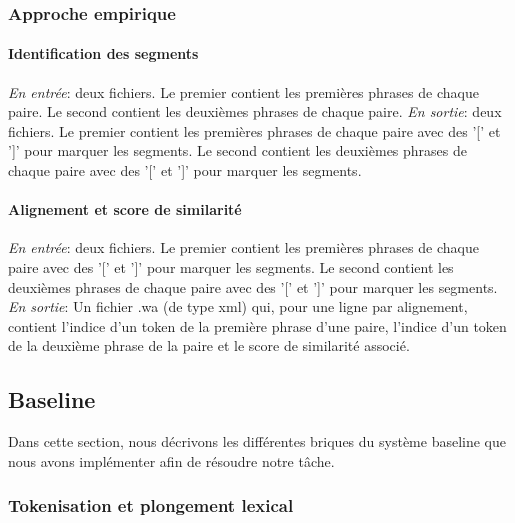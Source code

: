 \documentclass[a4paper, twoside, 11pt]{article}
\begin{document}
        \subsubsection{Approche empirique}

    \paragraph{Identification des segments}
    \hfill \break
    \textit{En entrée}: deux fichiers. Le premier contient les premières phrases de chaque paire. Le second contient les deuxièmes phrases de chaque paire. \hfill \break
    \textit{En sortie}: deux fichiers. Le premier contient les premières phrases de chaque paire avec des '[' et ']' pour marquer les segments. Le second contient les deuxièmes phrases de chaque paire avec des '[' et ']' pour marquer les segments.

 \paragraph{Alignement et score de similarité}
    \hfill \break
    \textit{En entrée}: deux fichiers. Le premier contient les premières phrases de chaque paire avec des '[' et ']' pour marquer les segments. Le second contient les deuxièmes phrases de chaque paire avec des '[' et ']' pour marquer les segments. \hfill \break
    \textit{En sortie}: Un fichier .wa (de type xml) qui, pour une ligne par alignement, contient l'indice d'un token de la première phrase d'une paire, l'indice d'un token de la deuxième phrase de la paire et le score de similarité associé.



    \subsection{Baseline}

    Dans cette section, nous décrivons les différentes briques du système baseline que nous avons implémenter afin de résoudre notre tâche.

    \subsubsection{Tokenisation et plongement lexical}
\end{document}

